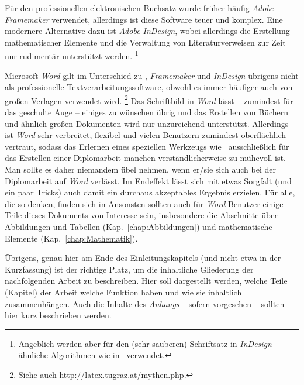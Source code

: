 Für den professionellen elektronischen Buchsatz wurde früher
häufig \emph{Adobe Framemaker} verwendet, allerdings ist diese
Software teuer und komplex. Eine modernere Alternative dazu ist
\emph{Adobe InDesign}, wobei allerdings die Erstellung
mathematischer Elemente und die Verwaltung von Literaturverweisen
zur Zeit nur rudimentär unterstützt werden.%
\footnote{Angeblich werden aber für den (sehr sauberen) Schriftsatz 
in \emph{InDesign} ähnliche Algorithmen wie in \latex\ verwendet.}

Microsoft \emph{Word} gilt im Unterschied zu \latex, 
\emph{Framemaker} und \emph{InDesign} übrigens nicht als professionelle
Textverarbeitungssoftware, obwohl es immer häufiger auch von
großen Verlagen verwendet wird.%
\footnote{Siehe auch \url{http://latex.tugraz.at/mythen.php}.}
Das Schriftbild in \emph{Word}
lässt -- zumindest für das geschulte Auge -- einiges zu wünschen
übrig und das Erstellen von Büchern und ähnlich großen Dokumenten
wird nur unzureichend unterstützt. Allerdings ist \emph{Word} sehr
verbreitet, flexibel und vielen Benutzern zumindest oberflächlich
vertraut, sodass das Erlernen eines speziellen Werkzeugs wie
\latex\ ausschließlich für das Erstellen einer Diplomarbeit
manchen verständlicherweise zu mühevoll ist. Man sollte es daher
niemandem übel nehmen, wenn er/sie sich auch bei der Diplomarbeit
auf \emph{Word} verlässt. Im Endeffekt lässt sich mit etwas
Sorgfalt (und ein paar Tricks) auch damit ein durchaus akzeptables
Ergebnis erzielen. 
Für alle, die so denken, finden sich in
Ansonsten sollten auch für \emph{Word}-Benutzer 
einige Teile dieses Dokuments von Interesse sein, insbesondere die
Abschnitte über Abbildungen und Tabellen
(Kap.~\ref{chap:Abbildungen}) und mathematische Elemente
(Kap.~\ref{chap:Mathematik}).






Übrigens, genau hier am Ende des Einleitungskapitels (und nicht
etwa in der Kurzfassung) ist der richtige Platz, um die
inhaltliche Gliederung der nachfolgenden Arbeit zu beschreiben.
Hier soll dargestellt werden, welche Teile (Kapitel) der Arbeit
welche Funktion haben und wie sie inhaltlich zusammenhängen. Auch
die Inhalte des \emph{Anhangs} -- sofern vorgesehen -- sollten hier
kurz beschrieben werden.



